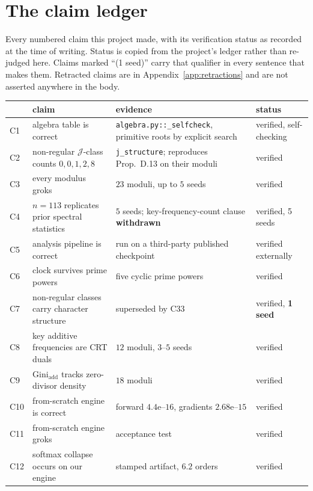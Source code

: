 \appendix

\section{The claim ledger}
\label{app:ledger}

Every numbered claim this project made, with its verification status as recorded at the time
of writing. Status is copied from the project's ledger rather than re-judged here. Claims
marked ``(1 seed)'' carry that qualifier in every sentence that makes them. Retracted
claims are in Appendix~\ref{app:retractions} and are not asserted anywhere in the body.

\begin{center}
\footnotesize
\begin{tabular}{l p{} p{} p{}}
  \toprule
  & claim & evidence & status \\
  \midrule
  C1 & algebra table is correct & \texttt{algebra.py::\_selfcheck}, primitive roots by explicit search & verified, self-checking \\
  C2 & non-regular $\mathcal{J}$-class counts $0,0,1,2,8$ & \texttt{j\_structure}; reproduces Prop.\ D.13 on their moduli & verified \\
  C3 & every modulus groks & $23$ moduli, up to $5$ seeds & verified \\
  C4 & $n=113$ replicates prior spectral statistics & $5$ seeds; key-frequency-count clause \textbf{withdrawn} & verified, 5 seeds \\
  C5 & analysis pipeline is correct & run on a third-party published checkpoint & verified externally \\
  C6 & clock survives prime powers & five cyclic prime powers & verified \\
  C7 & non-regular classes carry character structure & superseded by C33 & verified, \textbf{1 seed} \\
  C8 & key additive frequencies are CRT duals & $12$ moduli, $3$--$5$ seeds & verified \\
  C9 & $\mathrm{Gini}_{\text{add}}$ tracks zero-divisor density & $18$ moduli & verified \\
  C10 & from-scratch engine is correct & forward $4.4$e--$16$, gradients $2.68$e--$15$ & verified \\
  C11 & from-scratch engine groks & acceptance test & verified \\
  C12 & softmax collapse occurs on our engine & stamped artifact, $6.2$ orders & verified \\

\end{tabular}
\end{center}
